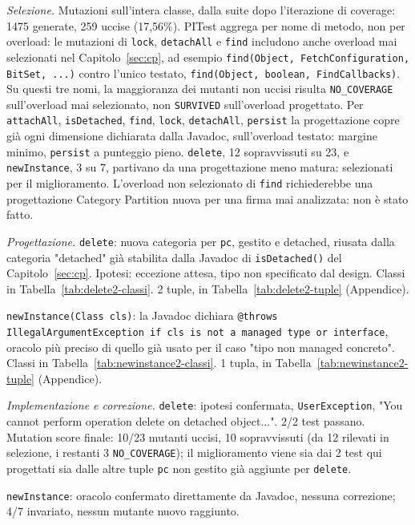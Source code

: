 \textit{Selezione.} Mutazioni sull'intera classe, dalla suite dopo l'iterazione di coverage: 1475
generate, 259 uccise (17,56\%). PITest aggrega per nome di metodo, non per overload: le mutazioni
di \texttt{lock}, \texttt{detachAll} e \texttt{find} includono anche overload mai selezionati nel
Capitolo~\ref{sec:cp}, ad esempio \texttt{find(Object, FetchConfiguration, BitSet, ...)} contro
l'unico testato, \texttt{find(Object, boolean, FindCallbacks)}. Su questi tre nomi, la
maggioranza dei mutanti non uccisi risulta \texttt{NO\_COVERAGE} sull'overload mai selezionato,
non \texttt{SURVIVED} sull'overload progettato. Per \texttt{attachAll}, \texttt{isDetached},
\texttt{find}, \texttt{lock}, \texttt{detachAll}, \texttt{persist} la progettazione copre già
ogni dimensione dichiarata dalla Javadoc, sull'overload testato: margine minimo, \texttt{persist}
a punteggio pieno. \texttt{delete}, 12 sopravvissuti su 23, e \texttt{newInstance}, 3 su 7,
partivano da una progettazione meno matura: selezionati per il miglioramento. L'overload non
selezionato di \texttt{find} richiederebbe una progettazione Category Partition nuova per una
firma mai analizzata: non è stato fatto.

\textit{Progettazione.} \texttt{delete}: nuova categoria per \texttt{pc}, gestito e detached,
riusata dalla categoria "detached" già stabilita dalla Javadoc di \texttt{isDetached()} del
Capitolo~\ref{sec:cp}. Ipotesi: eccezione attesa, tipo non specificato dal design. Classi in
Tabella~\ref{tab:delete2-classi}. 2 tuple, in Tabella~\ref{tab:delete2-tuple} (Appendice).

\texttt{newInstance(Class cls)}: la Javadoc dichiara \texttt{@throws IllegalArgumentException if
cls is not a managed type or interface}, oracolo più preciso di quello già usato per il caso "tipo
non managed concreto". Classi in Tabella~\ref{tab:newinstance2-classi}. 1 tupla, in Tabella~\ref{tab:newinstance2-tuple}
(Appendice).

\textit{Implementazione e correzione.} \texttt{delete}: ipotesi confermata, \texttt{UserException},
"You cannot perform operation delete on detached object...". 2/2 test passano. Mutation score
finale: 10/23 mutanti uccisi, 10 sopravvissuti (da 12 rilevati in selezione, i restanti 3
\texttt{NO\_COVERAGE}); il miglioramento viene sia dai 2 test qui
progettati sia dalle altre tuple \texttt{pc} non gestito già aggiunte per \texttt{delete}.

\texttt{newInstance}: oracolo confermato direttamente da Javadoc, nessuna correzione; 4/7
invariato, nessun mutante nuovo raggiunto.

